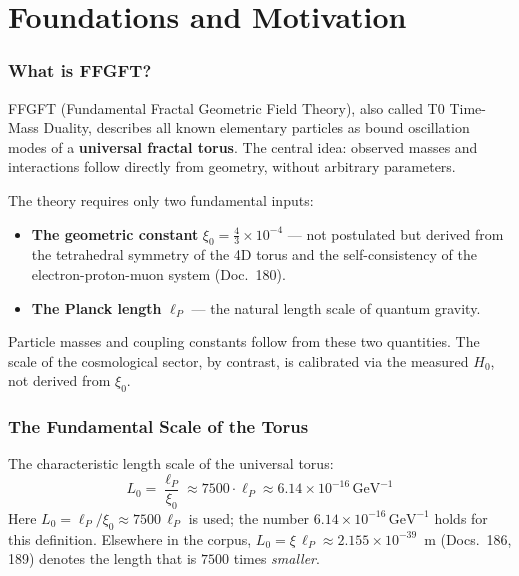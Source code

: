 
\part{Foundations and Motivation}

\section{What is FFGFT?}

FFGFT (Fundamental Fractal Geometric Field Theory), also called
T0 Time-Mass Duality, describes all known elementary particles
as bound oscillation modes of a \textbf{universal fractal torus}.
The central idea: observed masses and interactions follow directly
from geometry, without arbitrary parameters.

The theory requires only two fundamental inputs:

\begin{itemize}
  \item \textbf{The geometric constant}
    $\xi_0 = \frac{4}{3}\times 10^{-4}$ — not postulated but
    derived from the tetrahedral symmetry of the 4D torus and the
    self-consistency of the electron-proton-muon system (Doc.~180).
  \item \textbf{The Planck length} $\ell_P$ — the natural length scale
    of quantum gravity.
\end{itemize}

Particle masses and coupling constants follow from these two quantities.
The scale of the cosmological sector, by contrast, is calibrated via
the measured $H_0$, not derived from $\xi_0$.

\section{The Fundamental Scale of the Torus}

The characteristic length scale of the universal torus:
\begin{equation}
  L_0 = \frac{\ell_P}{\xi_0}
  \approx 7500 \cdot \ell_P
  \approx 6.14 \times 10^{-16}\,\text{GeV}^{-1}
\end{equation}
Here $L_0 = \ell_P/\xi_0 \approx 7500\,\ell_P$ is used; the number $6.14 \times 10^{-16}\,\text{GeV}^{-1}$ holds for this definition. Elsewhere in the corpus, $L_0 = \xi\,\ell_P \approx 2.155 \times 10^{-39}$~m (Docs.~186, 189) denotes the length that is $7500$ times \emph{smaller}.

